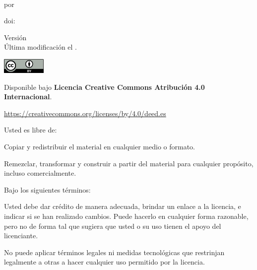\vspace*{\fill}

\noindent \textit{\Title{}} \\
por \Soler{}

\noindent doi: \href{https://doi.org/\ThesisDOI}{\ThesisDOI}

\vspace{4em}

\noindent Versión \ThesisVersion{} \\
Última modificación el .

\vspace{5em}

\noindent \includegraphics[height=2em]{figs/logos/cc-by.png}

\noindent Disponible bajo
{\bf Licencia Creative Commons Atribución 4.0 Internacional}.



\noindent
\url{https://creativecommons.org/licenses/by/4.0/deed.es}

\vspace{1em}

\noindent
Usted es libre de:

\begin{description}[labelindent=0.5cm]
    \item[Compartir:]{
        Copiar y redistribuir el material en cualquier medio o formato.
    }
    \item[Adaptar:]{
        Remezclar, transformar y construir a partir del material
        para cualquier propósito, incluso comercialmente.
    }
\end{description}

\noindent Bajo los siguientes términos:

\begin{description}[labelindent=0.5cm]
    \item[Atribución:]{
        Usted debe dar crédito de manera adecuada, brindar un enlace a la
        licencia, e indicar si se han realizado cambios. Puede hacerlo en cualquier
        forma razonable, pero no de forma tal que sugiera que usted o su uso tienen el
        apoyo del licenciante.
    }
    \item[No hay restricciones adicionales:]{
        No puede aplicar términos legales ni medidas tecnológicas que
        restrinjan legalmente a otras a hacer cualquier uso permitido por la
        licencia.
    }
\end{description}
